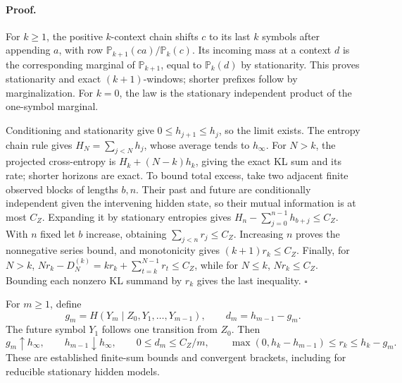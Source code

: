 \paragraph{Proof.}
For \(k\geq1\), the positive \(k\)-context chain shifts
\(c\) to its last \(k\) symbols after appending \(a\), with row
\(\mathbb P_{k+1}(ca)/\mathbb P_k(c)\). Its incoming mass at a context
\(d\) is the corresponding marginal of \(\mathbb P_{k+1}\), equal
to \(\mathbb P_k(d)\) by stationarity. This proves stationarity and
exact \((k+1)\)-windows; shorter prefixes follow by marginalization.
For \(k=0\), the law is the stationary independent product of the
one-symbol marginal.

Conditioning and stationarity give \(0\leq h_{j+1}\leq h_j\), so the
limit exists. The entropy chain rule gives \(H_N=\sum_{j<N}h_j\),
whose average tends to \(h_\infty\). For \(N>k\), the projected
cross-entropy is \(H_k+(N-k)h_k\), giving the exact KL sum and its rate;
shorter horizons are exact. To bound total excess, take two adjacent finite
observed blocks of lengths \(b,n\). Their past and future are conditionally
independent given the intervening hidden state, so their mutual information
is at most \(C_Z\). Expanding it by stationary entropies gives
\(H_n-\sum_{j=0}^{n-1}h_{b+j}\leq C_Z\). With \(n\) fixed let
\(b\) increase, obtaining \(\sum_{j<n}r_j\leq C_Z\). Increasing
\(n\) proves the nonnegative series bound, and monotonicity gives
\((k+1)r_k\leq C_Z\). Finally, for \(N>k\),
\(Nr_k-D_N^{(k)}=kr_k+\sum_{t=k}^{N-1}r_t\leq C_Z\), while for
\(N\leq k\), \(Nr_k\leq C_Z\). Bounding each nonzero KL summand
by \(r_k\) gives the last inequality. \(\square\)

For \(m\geq1\), define
\begin{equation}
 g_m=H(Y_m\mid Z_0,Y_1,\ldots,Y_{m-1}),\qquad
 d_m=h_{m-1}-g_m.
\label{eq:rg-memory-hidden-bracket}
\end{equation}
The future symbol \(Y_1\) follows one transition from \(Z_0\).
Then
\begin{equation}
 g_m\uparrow h_\infty,\qquad h_{m-1}\downarrow h_\infty,
 \qquad 0\leq d_m\leq C_Z/m,
 \qquad
 \max(0,h_k-h_{m-1})\leq r_k\leq h_k-g_m.
\label{eq:rg-memory-effective-bounds}
\end{equation}
These are established finite-sum bounds and convergent brackets, including
for reducible stationary hidden models. 

